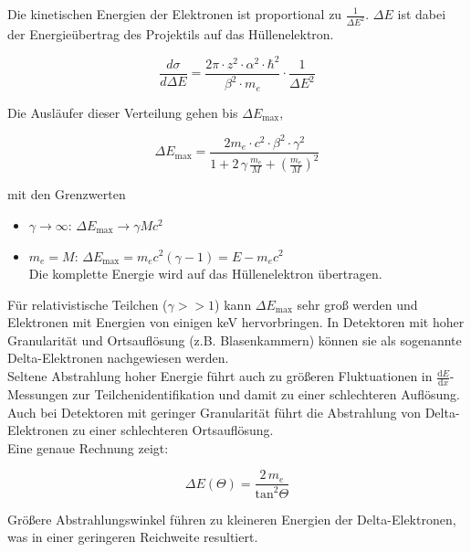 \FloatBarrier

Die kinetischen Energien der Elektronen ist proportional zu $\frac{1}{\Delta E^2}$.
$\Delta E$ ist dabei der Energieübertrag des Projektils auf das Hüllenelektron.

\[\frac{d\sigma}{d\Delta E} = \frac{2\pi\cdot z^2\cdot \alpha^2\cdot \hbar^2}{\beta^2\cdot m_e}\cdot
\frac{1}{\Delta E^2}
\]

Die Ausläufer dieser Verteilung gehen bis $\Delta E_\text{max}$,

\[\Delta E_\text{max} = \frac{2m_e\cdot c^2\cdot \beta^2\cdot \gamma^2}{1+ 2\,\gamma\,
\frac{m_e}{M}+\left( \frac{m_e}{M} \right)^2}\]

mit den Grenzwerten
\begin{itemize}
  \item $\gamma\rightarrow\infty$: $\Delta E_\text{max} \rightarrow \gamma Mc^2$
  \item $m_e = M$: $\Delta E_\text{max} =m_e c^2 (\gamma -1) = E- m_e c^2$ \\
  		Die komplette Energie wird auf das Hüllenelektron übertragen.
\end{itemize}

Für relativistische Teilchen ($\gamma >> 1$) kann $\Delta E_\text{max}$ sehr groß werden und
Elektronen mit Energien von einigen keV hervorbringen. In Detektoren mit hoher Granularität und Ortsauflösung (z.B.
Blasenkammern) können sie als sogenannte Delta-Elektronen nachgewiesen werden.
\\
Seltene Abstrahlung hoher Energie führt auch zu größeren Fluktuationen in $\frac{\mathrm{d}E}{\mathrm{d}x}$-Messungen
zur Teilchenidentifikation und damit zu einer schlechteren Auflösung. Auch bei Detektoren mit
geringer Granularität führt die Abstrahlung von Delta-Elektronen zu einer schlechteren
Ortsauflösung.
\\
Eine genaue Rechnung zeigt: 

\[\Delta E (\Theta) = \frac{2\,m_e}{\text{tan}^2\Theta} \]

Größere Abstrahlungswinkel führen zu kleineren Energien der Delta-Elektronen, was in einer
geringeren Reichweite resultiert.
\FloatBarrier